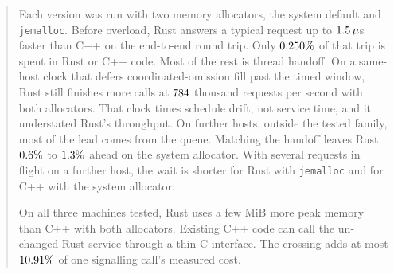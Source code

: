 \documentclass[english,oneside,a4paper,censored,csm,software-track-2020]{HYthesisML}
\begin{document}
{\begin{otherlanguage}{english}
\begin{abstract}
      Each version was run with two memory allocators, the system default and \texttt{jemalloc}.
      Before overload, Rust answers a typical request up to $\PFiftyDiffAbsMax\,\mu$s faster
      than C++ on the end-to-end round trip. Only $\BudgetCoreShareMax\%$ of that trip is
      spent in Rust or C++ code. Most of the rest is thread handoff. On a same-host clock that
      defers coordinated-omission fill past the timed window, Rust still finishes more calls at
      $\ProbeAfterOverloadLoad$ thousand requests per second with both allocators. That clock
      times schedule drift, not service time, and it understated Rust's throughput. On further
      hosts, outside the tested family, most of the lead comes from the queue. Matching
      the handoff leaves Rust $\HandoffSameLeadLo\%$ to $\HandoffSameLeadHi\%$ ahead on the system
      allocator. With several requests in flight on a further host, the wait is shorter for Rust with
      \texttt{jemalloc} and for C++ with the system allocator.

      On all three machines tested, Rust uses a few MiB more peak memory than C++ with both
      allocators. Existing C++ code can call the unchanged Rust service through a thin C
      interface. The crossing adds at most $\FfiOpBoundPct\%$ of one signalling call's measured
      cost.
      
\end{abstract}
\end{otherlanguage}
}

\cleardoublepage
{}
\setcounter{page}{1}
\tableofcontents

\cleardoublepage
{}
{}
\listoffigures

\cleardoublepage
{}
{}
\listoftables

\cleardoublepage
{}
{}
\chapter*{\nomname}
\markboth{\nomname}{\nomname}
\label{page:acronyms}
\end{document}
